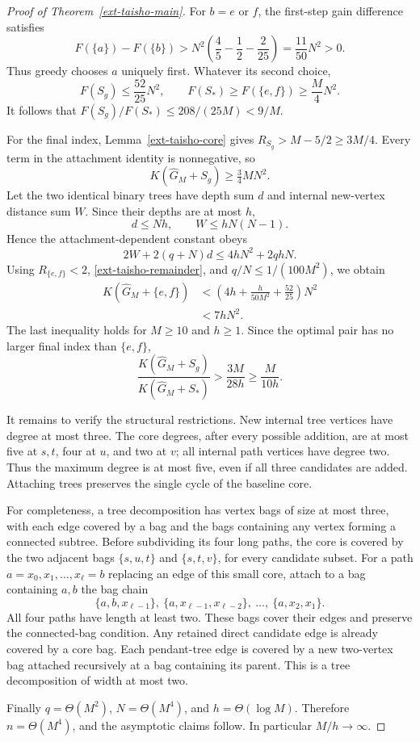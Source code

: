 \documentclass[11pt,a4paper]{article}
\theoremstyle{definition}\newtheorem{definition}[theorem]{Definition}
\theoremstyle{remark}\newtheorem{remark}[theorem]{Remark}
\numberwithin{equation}{section}
\begin{document}
\begin{proof}[Proof of Theorem~\ref{ext-taisho-main}]
For $b=e$ or $f$, the first-step gain difference satisfies
\[
 F(\{a\})-F(\{b\})
 >N^2\left(\frac45-\frac12-\frac2{25}\right)
 =\frac{11}{50}N^2>0.
\]
Thus greedy chooses $a$ uniquely first.  Whatever its second choice,
\[
 F(S_g)\le\frac{52}{25}N^2,
 \qquad F(S_*)\ge F(\{e,f\})\ge\frac M4N^2.
\]
It follows that $F(S_g)/F(S_*)\le208/(25M)<9/M$.

For the final index, Lemma~\ref{ext-taisho-core} gives
$R_{S_g}>M-5/2\ge3M/4$.  Every term in the attachment identity is nonnegative,
so
\[
 K(\widehat G_M+S_g)\ge\tfrac34 MN^2.
\]
Let the two identical binary trees have depth sum $d$ and internal new-vertex
distance sum $W$.  Since their depths are at most $h$,
\[
 d\le Nh,\qquad W\le hN(N-1).
\]
Hence the attachment-dependent constant obeys
\[
 2W+2(q+N)d\le4hN^2+2qhN.
\]
Using $R_{\{e,f\}}<2$, \eqref{ext-taisho-remainder}, and
$q/N\le1/(100M^2)$, we obtain
\begin{align*}
 K(\widehat G_M+\{e,f\})
 &<\left(4h+\frac{h}{50M^2}+\frac{52}{25}\right)N^2\\
 &<7hN^2.
\end{align*}
The last inequality holds for $M\ge10$ and $h\ge1$.
Since the optimal pair has no larger final index than $\{e,f\}$,
\[
 \frac{K(\widehat G_M+S_g)}{K(\widehat G_M+S_*)}
 >\frac{3M}{28h}\ge\frac{M}{10h}.
\]

It remains to verify the structural restrictions.  New internal tree vertices
have degree at most three.  The core degrees, after every possible addition,
are at most five at $s,t$, four at $u$, and two at $v$; all internal path vertices
have degree two.  Thus the maximum degree is at most five, even if all three
candidates are added.  Attaching trees preserves the single cycle of the
baseline core.

For completeness, a tree decomposition has vertex bags of size at most three,
with each edge covered by a bag and the bags containing any vertex forming a
connected subtree.  Before subdividing its four long paths, the core is covered
by the two adjacent bags $\{s,u,t\}$ and $\{s,t,v\}$, for every candidate subset.
For a path $a=x_0,x_1,\ldots,x_\ell=b$ replacing an edge of this small core,
attach to a bag containing $a,b$ the bag chain
\[
 \{a,b,x_{\ell-1}\},\
 \{a,x_{\ell-1},x_{\ell-2}\},\ \ldots,\
 \{a,x_2,x_1\}.
\]
All four paths have length at least two.  These bags cover their edges and
preserve the connected-bag condition.  Any retained direct candidate edge is
already covered by a core bag.  Each pendant-tree edge is covered by a new
two-vertex bag attached recursively at a bag containing its parent.  This is a
tree decomposition of width at most two.

Finally $q=\Theta(M^2)$, $N=\Theta(M^4)$, and $h=\Theta(\log M)$.  Therefore
$n=\Theta(M^4)$, and the asymptotic claims follow.  In particular
$M/h\longrightarrow\infty$.
\end{proof}
\end{document}
